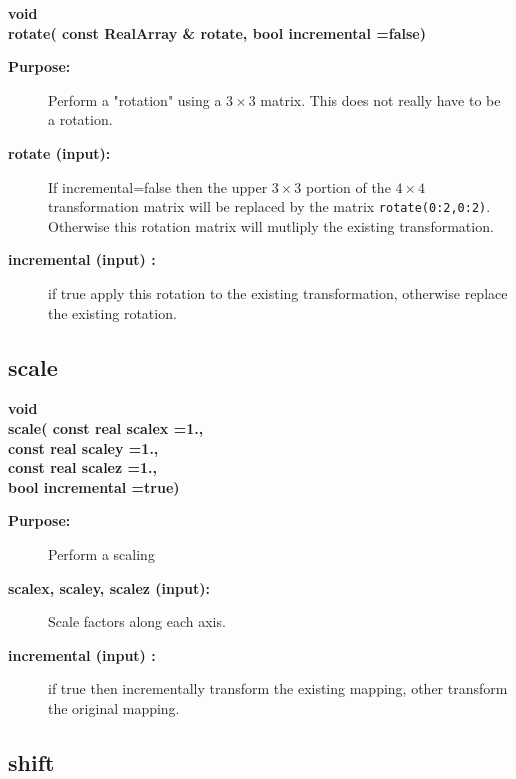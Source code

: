\begin{flushleft} \textbf{%
void  \\ 
\settowidth{\MatrixMappingIncludeArgIndent}{rotate(}%
rotate( const RealArray \& rotate, bool incremental  =false)
}\end{flushleft}
\begin{description}
\item[{\bf Purpose:}]  Perform a "rotation" using a $3\times3$ matrix. This does not really have to
  be a rotation. 
\item[{\bf rotate (input):}]  If incremental=false then the upper $3\times3$ portion of the $4\times4$ transformation
    matrix will be replaced by the matrix {\tt rotate(0:2,0:2)}. Otherwise this rotation matrix
    will mutliply the existing transformation.
\item[{\bf incremental (input) :}]  if true apply this rotation to the existing transformation,
    otherwise replace the existing rotation.
\end{description}
\subsection{scale}
 
\begin{flushleft} \textbf{%
void  \\ 
\settowidth{\MatrixMappingIncludeArgIndent}{scale(}%
scale( const real scalex  =1.,\\ 
\hspace{\MatrixMappingIncludeArgIndent}const real scaley  =1., \\ 
\hspace{\MatrixMappingIncludeArgIndent}const real scalez  =1., \\ 
\hspace{\MatrixMappingIncludeArgIndent}bool incremental   =true)
}\end{flushleft}
\begin{description}
\item[{\bf Purpose:}]  Perform a scaling 
\item[{\bf scalex, scaley, scalez (input):}]  Scale factors along each axis.
\item[{\bf incremental (input) :}]  if true then incrementally transform the 
       existing mapping, other transform the original mapping.
\end{description}
\subsection{shift}
 
